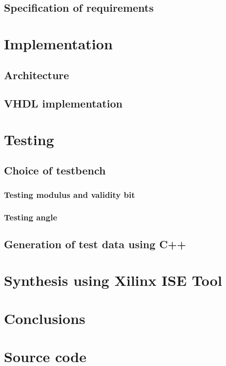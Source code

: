 \documentclass[12pt,a4paper,openright]{report}
\begin{document}
\section{Specification of requirements}




\chapter{Implementation}

\section{Architecture}

\section{VHDL implementation}




\chapter{Testing}

\section{Choice of testbench}
\subsection{Testing modulus and validity bit}

\subsection{Testing angle}

\section{Generation of test data using C++}




\chapter{Synthesis using Xilinx ISE Tool}




\chapter{Conclusions}




\appendix

\chapter{Source code}
\end{document}
